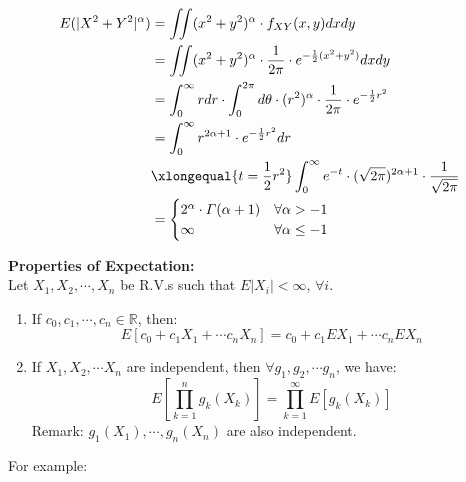 \documentclass{article}
\begin{document}
\begin{align*}
    E(|X^{2}+Y^{2}|^{\alpha}) &= \iint (x^{2} + y^{2})^{\alpha} \cdot f_{XY}(x,y)  dx dy\\
                              &= \iint (x^{2} + y^{2})^{\alpha} \cdot \frac{1}{2\pi} \cdot e^{-\frac{1}{2} (x^{2} +y^{2})} dx dy\\
                              &= \int_{0}^{\infty} r dr \cdot \int_{0}^{2\pi} d\theta \cdot (r^{2})^{\alpha} \cdot \frac{1}{2\pi} \cdot e^{-\frac{1}{2} r^{2}}\\
                              &= \int_{0}^{\infty} r^{2\alpha + 1} \cdot e^{-\frac{1}{2} r^{2}} dr \\
                              &\xlongequal{t = \frac{1}{2} r^{2}} \int_{0}^{\infty}e^{-t} \cdot (\sqrt{2\pi})^{2\alpha +1} \cdot \frac{1}{\sqrt{2\pi}}\\
                              &= \begin{cases}
                                2^{\alpha} \cdot \varGamma(\alpha +1) & \forall \alpha > -1\\
                                \infty & \forall \alpha \leq -1
                              \end{cases}
\end{align*}


\newpage

\begin{theorem}
    \textbf{Properties of Expectation:}\\
    Let $X_{1},X_{2},\cdots,X_{n}$ be R.V.s such that $E|X_{i}| < \infty,\,\forall i$.
    \begin{enumerate}
    \item If $c_{0}, c_{1},\cdots , c_{n}\in \mathbb{R}$, then:
          \[ E[c_{0} + c_{1}X_{1} + \cdots c_{n}X_{n}] = c_{0} + c_{1} EX_{1} + \cdots c_{n} EX_{n} \]
    \item If $X_{1}, X_{2}, \cdots X_{n}$ are independent, then $\forall g_{1},g_{2}, \cdots g_{n}$, we have:
          \[ E[\prod_{k=1}^{n}g_{k}(X_{k})] = \prod_{k=1}^{\infty} E[g_{k}(X_{k})] \]
          Remark: $g_{1}(X_{1}), \cdots ,g_{n}(X_{n}) $ are also independent. 
    \end{enumerate} 
\end{theorem}


For example:
\end{document}
